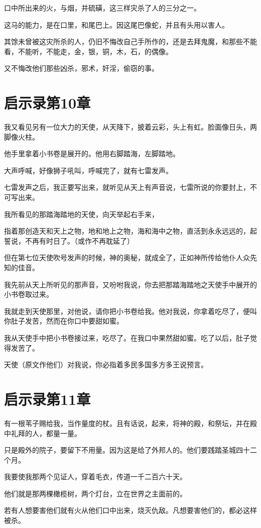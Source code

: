 \documentclass[12pt,oneside]{book}
\begin{document}
口中所出来的火，与烟，并硫磺，这三样灾杀了人的三分之一。

这马的能力，是在口里，和尾巴上。因这尾巴像蛇，并且有头用以害人。

其馀未曾被这灾所杀的人，仍旧不悔改自己手所作的，还是去拜鬼魔，和那些不能看，不能听，不能走，金，银，铜，木，石，的偶像。

又不悔改他们那些凶杀，邪术，奸淫，偷窃的事。

\chapter{启示录第10章}
我又看见另有一位大力的天使，从天降下，披着云彩，头上有虹。脸面像日头，两脚像火柱。

他手里拿着小书卷是展开的。他用右脚踏海，左脚踏地。

大声呼喊，好像狮子吼叫，呼喊完了，就有七雷发声。

七雷发声之后，我正要写出来，就听见从天上有声音说，七雷所说的你要封上，不可写出来。

我所看见的那踏海踏地的天使，向天举起右手来，

指着那创造天和天上之物，地和地上之物，海和海中之物，直活到永永远远的，起誓说，不再有时日了。（或作不再耽延了）

但在第七位天使吹号发声的时候，神的奥秘，就成全了，正如神所传给他仆人众先知的佳音。

我先前从天上所听见的那声音，又吩咐我说，你去把那踏海踏地之天使手中展开的小书卷取过来。

我就走到天使那里，对他说，请你把小书卷给我。他对我说，你拿着吃尽了，便叫你肚子发苦，然而在你口中要甜如蜜。

我从天使手中把小书卷接过来，吃尽了。在我口中果然甜如蜜。吃了以后，肚子觉得发苦了。

天使（原文作他们）对我说，你必指着多民多国多方多王说预言。

\chapter{启示录第11章}
有一根苇子赐给我，当作量度的杖。且有话说，起来，将神的殿，和祭坛，并在殿中礼拜的人，都量一量。

只是殿外的院子，要留下不用量。因为这是给了外邦人的。他们要践踏圣城四十二个月。

我要使我那两个见证人，穿着毛衣，传道一千二百六十天。

他们就是那两棵橄榄树，两个灯台，立在世界之主面前的。

若有人想要害他们就有火从他们口中出来，烧灭仇敌。凡想要害他们的，都必这样被杀。
\end{document}

